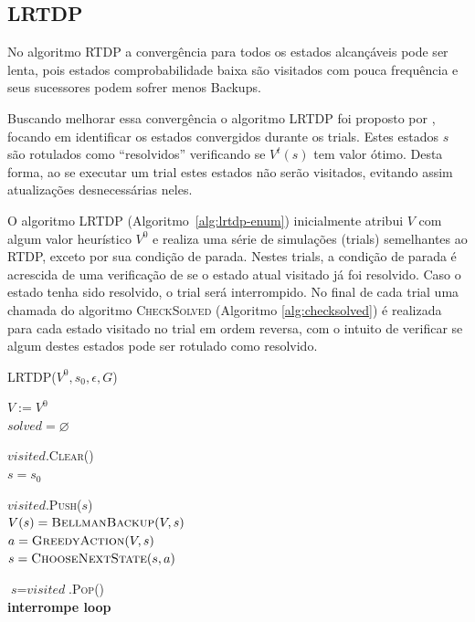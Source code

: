 \documentclass[letterpaper]{article}
\begin{document}

\subsection{LRTDP}

No algoritmo RTDP a convergência para todos os estados alcançáveis pode ser lenta, pois estados comprobabilidade baixa são visitados com pouca frequência e seus sucessores podem sofrer menos Backups.

Buscando melhorar essa convergência o algoritmo LRTDP foi proposto por \cite{BonetGeffer-2003}, focando em identificar
os estados convergidos durante os trials. Estes estados $s$ são rotulados como ``resolvidos'' verificando se $V^t(s)$ tem
valor ótimo. Desta forma, ao se executar um trial estes estados não serão visitados, evitando assim atualizações desnecessárias neles.

O algoritmo LRTDP (Algoritmo~\ref{alg:lrtdp-enum}) inicialmente atribui $V$ com algum valor heurístico $V^0$ e realiza uma série de simulações (trials) semelhantes ao RTDP, exceto por sua condição de parada. Nestes trials, a condição de parada é acrescida de uma verificação de se o estado atual visitado já foi resolvido. Caso o estado tenha sido resolvido, o trial será interrompido. No final de cada trial uma chamada do algoritmo \textsc{CheckSolved} (Algoritmo \ref{alg:checksolved}) é realizada para cada estado visitado no trial em ordem reversa, com o intuito de verificar se algum destes estados pode ser rotulado como resolvido.

\linesnumbered
\begin{algorithm}[t]
{
	\caption{\textsc{LRTDP}($ V^0, s_0, \epsilon, G $)}
	\label{alg:lrtdp-enum}
    $V := V^0$\\
    $ \textit{solved} = \varnothing $\\

    {
        $\textit{visited}$.\textsc{Clear}() \\
        $\textit{s} = s_0 $

        {
            $\mathit{visited}$.\textsc{Push}($\textit{s}$)\\

            $V(s) = \textsc{BellmanBackup}(V, s)$ \\
           	$a = \textsc{GreedyAction}(V, s)$ \\
           	$s = \textsc{ChooseNextState}(s, a)$ \\
        }

        {
            $\textit{s} = \textit{visited}$.\textsc{Pop}()\\
             {\textbf{interrompe loop}}
        }
    }

}
\end{algorithm}
\end{document}
